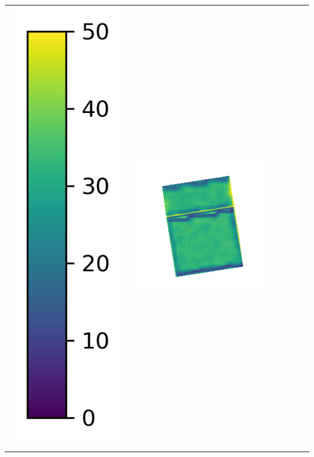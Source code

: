 \begin{center}
\begin{tabularx}{\linewidth}{@{}Y@{}Y@{}Y@{}Y@{}Y@{}Y@{}}
\includegraphics[width=0.2\linewidth]{semisynthetic/colorbar_error_vertical.png} &
\includegraphics[width=\linewidth]{semisynthetic/20160617_0_ours_err.png} &

\end{tabularx}
\end{center}
